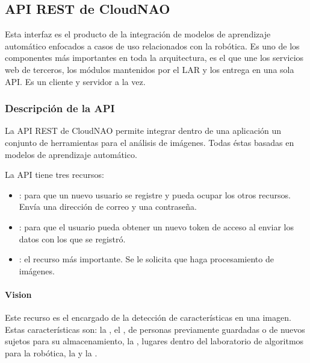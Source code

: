 

\subsection{API REST de CloudNAO}
\label{chapter_two/desc_cloudnao:api-rest-de-cloudnao}

Esta interfaz es el producto de la integración de modelos de aprendizaje
automático
enfocados a casos de uso relacionados con la robótica.
Es uno de los componentes más importantes en toda la arquitectura,
es el que une los servicios web de
terceros, los módulos mantenidos por el LAR y los entrega en una sola API.
Es un cliente y servidor a la vez.


\subsubsection{Descripción de la API}
\label{\detokenize{chapter_two/desc_cloudnao:documentacion-para-desarrolladores-clientes}}
La API REST de CloudNAO permite integrar dentro de una aplicación un
conjunto de herramientas para el análisis de imágenes.
Todas éstas basadas en modelos de aprendizaje automático. 

La API tiene tres recursos:
\begin{itemize}
\item {} 
: para que un nuevo usuario se registre y pueda ocupar los otros recursos. Envía una dirección de correo y una contraseña.

\item {} 
: para que el usuario pueda obtener un nuevo token de acceso al enviar los datos con los que se registró.

\item {} 
: el recurso más importante. Se le solicita que haga procesamiento de imágenes.

\end{itemize}

\paragraph{Vision}
\label{\detokenize{chapter_two/desc_cloudnao:vision}}
Este recurso es el encargado de la detección de características en una
imagen. Estas características son: la , el
, de personas previamente guardadas o de
nuevos sujetos para su almacenamiento, la , lugares
dentro del laboratorio de algoritmos para la robótica, la
y la .

